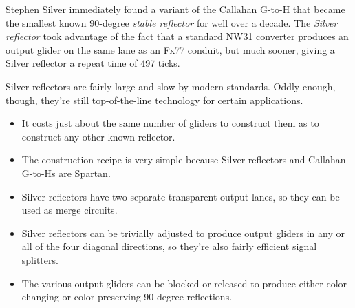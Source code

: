 Stephen Silver immediately found a variant of the Callahan G-to-H that became the smallest known 90-degree \emph{stable reflector} for well over a decade.  The \emph{Silver reflector} took advantage of the fact that a standard NW31 converter produces an output glider on the same lane as an Fx77 conduit, but much sooner, giving a Silver reflector a repeat time of 497 ticks.

%

Silver reflectors are fairly large and slow by modern standards.  Oddly enough, though, they're still top-of-the-line technology for certain applications.

\begin{itemize}
	\item It costs just about the same number of gliders to construct them as to construct any other known reflector.\smallskip
	\item The construction recipe is very simple because Silver reflectors and Callahan G-to-Hs are Spartan.\smallskip
	\item Silver reflectors have two separate transparent output lanes, so they can be used as merge circuits.\smallskip
	\item Silver reflectors can be trivially adjusted to produce output gliders in any or all of the four diagonal directions, so they're also fairly efficient signal splitters.\smallskip
	\item The various output gliders can be blocked or released to produce either color-changing or color-preserving 90-degree reflections.\medskip
\end{itemize}

